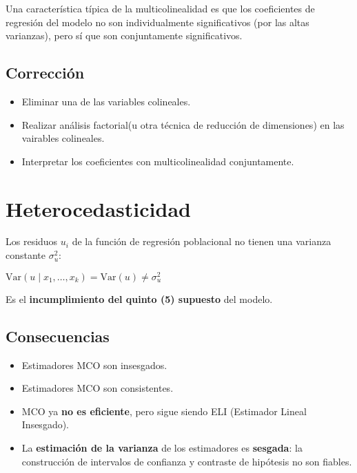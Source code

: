 \documentclass[10pt, a4paper, landscape]{article}
\newcommand{\Var}{\mathrm{Var}}
\begin{document}
\begin{multicols}{3}
		Una característica típica de la multicolinealidad es que los coeficientes de regresión del modelo no son individualmente significativos (por las altas varianzas), pero sí que son conjuntamente significativos.
		
		\subsection*{Corrección}
		
		\begin{itemize}[leftmargin=*]
			\item Eliminar una de las variables colineales.
			\item Realizar análisis factorial(u otra técnica de reducción de dimensiones) en las vairables colineales.
			\item Interpretar los coeficientes con multicolinealidad conjuntamente.
		\end{itemize}
		
		\columnbreak
		
		\section*{Heterocedasticidad}
		
		Los residuos $u_{i}$ de la función de regresión poblacional no tienen una varianza constante $\sigma^{2}_{u}$:
		
		\begin{center}
			$\Var(u \mid x_{1}, \ldots, x_{k}) = \Var(u) \neq \sigma^{2}_{u}$
		\end{center}
		
		Es el \textbf{incumplimiento del quinto (5) supuesto} del modelo.
		
		\subsection*{Consecuencias}
		
		\begin{itemize}[leftmargin=*]
			\item Estimadores MCO son insesgados.
			\item Estimadores MCO son consistentes.
			\item MCO ya \textbf{no es eficiente}, pero sigue siendo ELI (Estimador Lineal Insesgado).
			\item La \textbf{estimación de la varianza} de los estimadores es \textbf{sesgada}: la construcción de intervalos de confianza y contraste de hipótesis no son fiables.
		\end{itemize}
		

\end{multicols}
\end{document}
